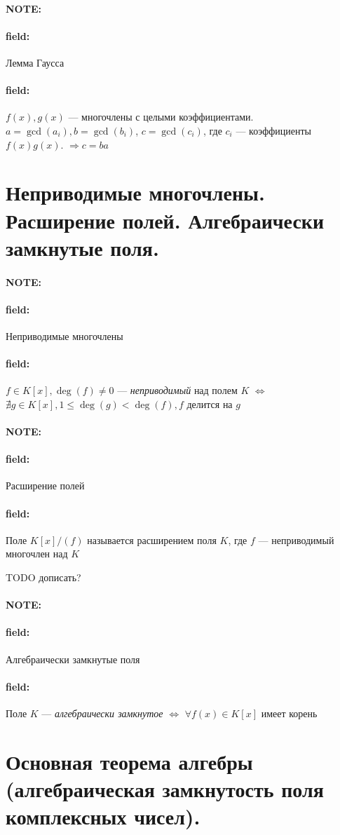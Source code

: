 \documentclass[12pt]{article}
\newenvironment{note}{\paragraph{NOTE:}}{}
\newenvironment{field}{\paragraph{field:}}{}
\begin{document}
\begin{note}
  \begin{field}
    Лемма Гаусса
  \end{field}
  \begin{field}
    $f(x), g(x)$ --- многочлены с целыми коэффициентами.
    $a = \gcd(a_{i}), b = \gcd(b_{i})$,
    $c = \gcd(c_{i})$, где $c_{i}$ --- коэффициенты $f(x)g(x)$.
    $\Rightarrow c = ba$
  \end{field}
\end{note}

\section{Неприводимые многочлены. Расширение полей. Алгебраически замкнутые
поля.}

\begin{note}
  \begin{field}
    Неприводимые многочлены
  \end{field}
  \begin{field}
    $f \in K[x], \deg(f) \neq 0$ --- \emph{неприводимый} над полем $K$
    $\Leftrightarrow$
    $\nexists g \in K[x], 1 \leq \deg(g) < \deg(f), f$ делится на $g$
  \end{field}
\end{note}

\begin{note}
  \begin{field}
    Расширение полей
  \end{field}
  \begin{field}
    Поле $K[x]/(f)$ называется расширением поля $K$,
    где $f$ --- неприводимый многочлен над $K$

    TODO дописать?
  \end{field}
\end{note}

\begin{note}
  \begin{field}
    Алгебраически замкнутые поля
  \end{field}
  \begin{field}
    Поле $K$ --- \emph{алгебраически замкнутое}
    $\Leftrightarrow$
    $\forall f(x) \in K[x]$ имеет корень
  \end{field}
\end{note}

\section{Основная теорема алгебры (алгебраическая замкнутость поля комплексных
чисел).}
\end{document}
